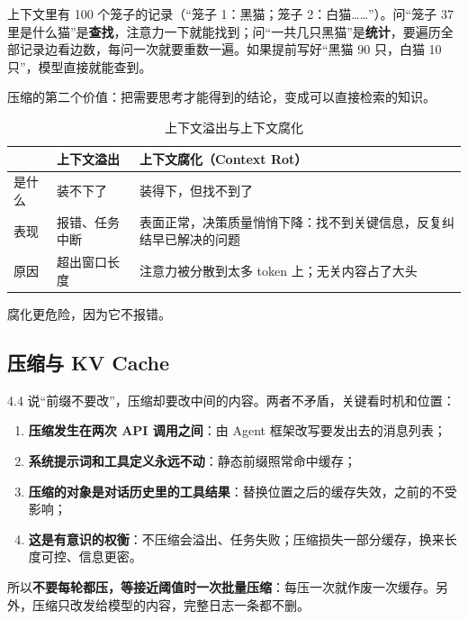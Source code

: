 上下文里有 100 个笼子的记录（“笼子 1：黑猫；笼子 2：白猫……”）。问“笼子 37 里是什么猫”是\textbf{查找}，注意力一下就能找到；问“一共几只黑猫”是\textbf{统计}，要遍历全部记录边看边数，每问一次就要重数一遍。如果提前写好“黑猫 90 只，白猫 10 只”，模型直接就能查到。
\begin{tcolorbox}[enhanced, sharp corners, boxrule=0pt, frame hidden,
                  borderline west={3pt}{0pt}{structurecolor},
                  colback=structurecolor!5]
压缩的第二个价值：把需要思考才能得到的结论，变成可以直接检索的知识。
\end{tcolorbox}

\begin{table}[H]
\centering
\caption{上下文溢出与上下文腐化}
\label{tab:overflow-vs-rot}
\begin{tabular}{p{2.0cm} p{5.6cm} p{7.0cm}}
  \toprule
   & 上下文溢出 & 上下文腐化（Context Rot） \\
  \midrule
  是什么 & 装不下了 & 装得下，但找不到了 \\
  \addlinespace
  表现 & 报错、任务中断 & 表面正常，决策质量悄悄下降：找不到关键信息，反复纠结早已解决的问题 \\
  \addlinespace
  原因 & 超出窗口长度 & 注意力被分散到太多 token 上；无关内容占了大头 \\
  \bottomrule
\end{tabular}
\end{table}
腐化更危险，因为它不报错。

\subsection{压缩与 KV Cache}
4.4 说“前缀不要改”，压缩却要改中间的内容。两者不矛盾，关键看时机和位置：
\begin{enumerate}
  \item \textbf{压缩发生在两次 API 调用之间}：由 Agent 框架改写要发出去的消息列表；
  \item \textbf{系统提示词和工具定义永远不动}：静态前缀照常命中缓存；
  \item \textbf{压缩的对象是对话历史里的工具结果}：替换位置之后的缓存失效，之前的不受影响；
  \item \textbf{这是有意识的权衡}：不压缩会溢出、任务失败；压缩损失一部分缓存，换来长度可控、信息更密。
\end{enumerate}
所以\textbf{不要每轮都压，等接近阈值时一次批量压缩}：每压一次就作废一次缓存。另外，压缩只改发给模型的内容，完整日志一条都不删。

